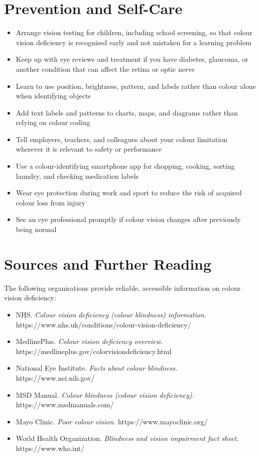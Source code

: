 \section*{Prevention and Self-Care}
\begin{itemize}
    \item Arrange vision testing for children, including school screening, so that colour vision deficiency is recognised early and not mistaken for a learning problem
    \item Keep up with eye reviews and treatment if you have diabetes, glaucoma, or another condition that can affect the retina or optic nerve
    \item Learn to use position, brightness, pattern, and labels rather than colour alone when identifying objects
    \item Add text labels and patterns to charts, maps, and diagrams rather than relying on colour coding
    \item Tell employers, teachers, and colleagues about your colour limitation wherever it is relevant to safety or performance
    \item Use a colour-identifying smartphone app for shopping, cooking, sorting laundry, and checking medication labels
    \item Wear eye protection during work and sport to reduce the risk of acquired colour loss from injury
    \item See an eye professional promptly if colour vision changes after previously being normal
\end{itemize}

\section*{Sources and Further Reading}
The following organisations provide reliable, accessible information on colour vision deficiency:

\begin{itemize}
    \item NHS. \textit{Colour vision deficiency (colour blindness) information.} https://www.nhs.uk/conditions/colour-vision-deficiency/
    \item MedlinePlus. \textit{Colour vision deficiency overview.} https://medlineplus.gov/colorvisiondeficiency.html
    \item National Eye Institute. \textit{Facts about colour blindness.} https://www.nei.nih.gov/
    \item MSD Manual. \textit{Colour blindness (colour vision deficiency).} https://www.msdmanuals.com/
    \item Mayo Clinic. \textit{Poor colour vision.} https://www.mayoclinic.org/
    \item World Health Organization. \textit{Blindness and vision impairment fact sheet.} https://www.who.int/
\end{itemize}
